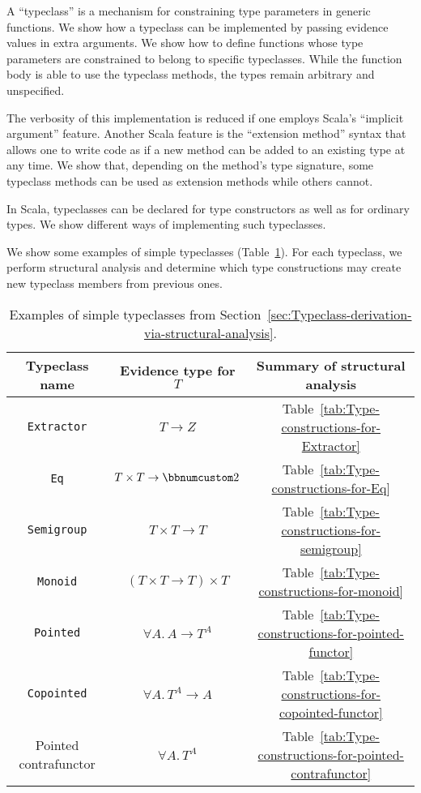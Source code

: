 A \textsf{``}typeclass\textsf{''} is a mechanism for constraining type parameters
in generic functions. We show how a typeclass can be implemented by
passing evidence values in extra arguments. We show how to define
functions whose type parameters are constrained to belong to specific
typeclasses. While the function body is able to use the typeclass
methods, the types remain arbitrary and unspecified.

The verbosity of this implementation is reduced if one employs Scala\textsf{'}s
\textsf{``}implicit argument\textsf{''} feature. Another Scala feature is the \textsf{``}extension
method\textsf{''} syntax that allows one to write code as if a new method
can be added to an existing type at any time. We show that, depending
on the method\textsf{'}s type signature, some typeclass methods can be used
as extension methods while others cannot.

In Scala, typeclasses can be declared for type constructors as well
as for ordinary types. We show different ways of implementing such
typeclasses.

We show some examples of simple typeclasses (Table~\ref{tab:Examples-of-simple-typeclasses}).
For each typeclass, we perform structural analysis and determine which
type constructions may create new typeclass members from previous
ones. 

\begin{table}
\begin{centering}
\begin{tabular}{|c|c|c|}
\hline 
\textbf{\small{}Typeclass name} & \textbf{\small{}Evidence type for $T$} & \textbf{\small{}Summary of structural analysis}\tabularnewline
\hline 
\hline 
{\small{}}\lstinline!Extractor! & {\small{}$T\rightarrow Z$} & {\small{}Table~\ref{tab:Type-constructions-for-Extractor}}\tabularnewline
\hline 
{\small{}}\lstinline!Eq! & {\small{}$T\times T\rightarrow\bbnum 2$} & {\small{}Table~\ref{tab:Type-constructions-for-Eq}}\tabularnewline
\hline 
{\small{}}\lstinline!Semigroup! & {\small{}$T\times T\rightarrow T$} & {\small{}Table~\ref{tab:Type-constructions-for-semigroup}}\tabularnewline
\hline 
{\small{}}\lstinline!Monoid! & {\small{}$(T\times T\rightarrow T)\times T$} & {\small{}Table~\ref{tab:Type-constructions-for-monoid}}\tabularnewline
\hline 
{\small{}}\lstinline!Pointed! & {\small{}$\forall A.\,A\rightarrow T^{A}$} & {\small{}Table~\ref{tab:Type-constructions-for-pointed-functor}}\tabularnewline
\hline 
{\small{}}\lstinline!Copointed! & {\small{}$\forall A.\,T^{A}\rightarrow A$} & {\small{}Table~\ref{tab:Type-constructions-for-copointed-functor}}\tabularnewline
\hline 
{\small{}Pointed contrafunctor} & {\small{}$\forall A.\,T^{A}$} & {\small{}Table~\ref{tab:Type-constructions-for-pointed-contrafunctor}}\tabularnewline
\hline 
\end{tabular}
\par\end{centering}
\caption{\label{tab:Examples-of-simple-typeclasses}Examples of simple typeclasses
from Section~\ref{sec:Typeclass-derivation-via-structural-analysis}.}
\end{table}

